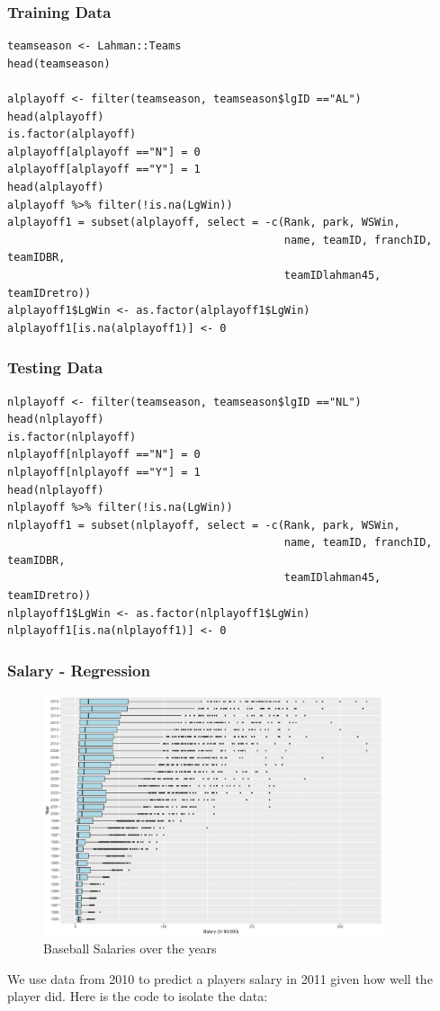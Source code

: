 \documentclass[11pt,a4paper]{report}
\begin{document}
\subsubsection{Training Data}
\begin{lstlisting}[basicstyle=\scriptsize]
teamseason <- Lahman::Teams
head(teamseason)

alplayoff <- filter(teamseason, teamseason$lgID =="AL")
head(alplayoff)
is.factor(alplayoff)
alplayoff[alplayoff =="N"] = 0
alplayoff[alplayoff =="Y"] = 1
head(alplayoff)
alplayoff %>% filter(!is.na(LgWin))
alplayoff1 = subset(alplayoff, select = -c(Rank, park, WSWin, 
                                           name, teamID, franchID, teamIDBR,
                                           teamIDlahman45, teamIDretro))
alplayoff1$LgWin <- as.factor(alplayoff1$LgWin)
alplayoff1[is.na(alplayoff1)] <- 0

\end{lstlisting}

\subsubsection{Testing Data}
\begin{lstlisting}[basicstyle=\scriptsize]
nlplayoff <- filter(teamseason, teamseason$lgID =="NL")
head(nlplayoff)
is.factor(nlplayoff)
nlplayoff[nlplayoff =="N"] = 0
nlplayoff[nlplayoff =="Y"] = 1
head(nlplayoff)
nlplayoff %>% filter(!is.na(LgWin))
nlplayoff1 = subset(nlplayoff, select = -c(Rank, park, WSWin, 
                                           name, teamID, franchID, teamIDBR,
                                           teamIDlahman45, teamIDretro))
nlplayoff1$LgWin <- as.factor(nlplayoff1$LgWin)
nlplayoff1[is.na(nlplayoff1)] <- 0
\end{lstlisting}



\subsubsection{Salary - Regression}
\begin{figure}
    \centering
    \includegraphics[width=10cm]{photographs/Salaries.pdf}
    \caption{Baseball Salaries over the years}
    \label{fig:Salary}
\end{figure}
We use data from 2010 to predict a players salary in 2011 given how well the player did. Here is the code to isolate the data:
\end{document}
